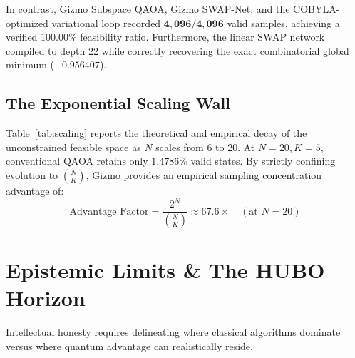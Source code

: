 \documentclass[10pt,twocolumn]{article}
\begin{document}
In contrast, Gizmo Subspace QAOA, Gizmo SWAP-Net, and the COBYLA-optimized variational loop recorded $\mathbf{4,096 / 4,096}$ valid samples, achieving a verified $\mathbf{100.00\%}$ feasibility ratio. Furthermore, the linear SWAP network compiled to depth 22 while correctly recovering the exact combinatorial global minimum ($-0.956407$).

\begin{table}[b]
\centering
\caption{Combinatorial Scaling: Feasible Subspace Ratio vs. Problem Size ($K = \lfloor N/4 \rfloor$)}
\label{tab:scaling}
\vspace{2pt}
\end{table}

\subsection{The Exponential Scaling Wall}
Table~\ref{tab:scaling} reports the theoretical and empirical decay of the unconstrained feasible space as $N$ scales from 6 to 20. At $N=20, K=5$, conventional QAOA retains only $1.4786\%$ valid states. By strictly confining evolution to $\binom{N}{K}$, Gizmo provides an empirical sampling concentration advantage of:
\begin{equation}
\text{Advantage Factor} = \frac{2^N}{\binom{N}{K}} \approx 67.6\times \quad (\text{at } N=20)
\end{equation}

\section{Epistemic Limits \& The HUBO Horizon}
Intellectual honesty requires delineating where classical algorithms dominate versus where quantum advantage can realistically reside.
\end{document}
